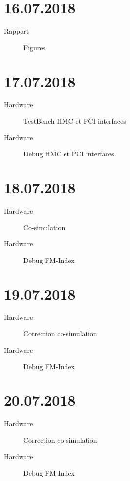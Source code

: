 \section*{16.07.2018}

\begin{description}
	\item [Rapport] Figures
\end{description}

\section*{17.07.2018}

\begin{description}
    \item [Hardware] TestBench HMC et PCI interfaces
    \item [Hardware] Debug HMC et PCI interfaces
	\end{description}

\section*{18.07.2018}

\begin{description}
	\item [Hardware] Co-simulation
	\item [Hardware] Debug FM-Index
\end{description}

\section*{19.07.2018}

\begin{description}
	\item [Hardware] Correction co-simulation 
	\item [Hardware] Debug FM-Index
\end{description}

\section*{20.07.2018}

\begin{description}
	\item [Hardware] Correction co-simulation 
	\item [Hardware] Debug FM-Index
\end{description}

